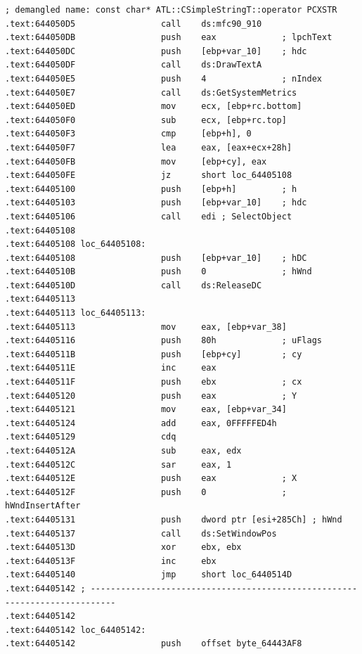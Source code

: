 \begin{lstlisting}
; demangled name: const char* ATL::CSimpleStringT::operator PCXSTR 
.text:644050D5                 call    ds:mfc90_910
.text:644050DB                 push    eax             ; lpchText
.text:644050DC                 push    [ebp+var_10]    ; hdc
.text:644050DF                 call    ds:DrawTextA
.text:644050E5                 push    4               ; nIndex
.text:644050E7                 call    ds:GetSystemMetrics
.text:644050ED                 mov     ecx, [ebp+rc.bottom]
.text:644050F0                 sub     ecx, [ebp+rc.top]
.text:644050F3                 cmp     [ebp+h], 0
.text:644050F7                 lea     eax, [eax+ecx+28h]
.text:644050FB                 mov     [ebp+cy], eax
.text:644050FE                 jz      short loc_64405108
.text:64405100                 push    [ebp+h]         ; h
.text:64405103                 push    [ebp+var_10]    ; hdc
.text:64405106                 call    edi ; SelectObject
.text:64405108
.text:64405108 loc_64405108:
.text:64405108                 push    [ebp+var_10]    ; hDC
.text:6440510B                 push    0               ; hWnd
.text:6440510D                 call    ds:ReleaseDC
.text:64405113
.text:64405113 loc_64405113:
.text:64405113                 mov     eax, [ebp+var_38]
.text:64405116                 push    80h             ; uFlags
.text:6440511B                 push    [ebp+cy]        ; cy
.text:6440511E                 inc     eax
.text:6440511F                 push    ebx             ; cx
.text:64405120                 push    eax             ; Y
.text:64405121                 mov     eax, [ebp+var_34]
.text:64405124                 add     eax, 0FFFFFED4h
.text:64405129                 cdq
.text:6440512A                 sub     eax, edx
.text:6440512C                 sar     eax, 1
.text:6440512E                 push    eax             ; X
.text:6440512F                 push    0               ; hWndInsertAfter
.text:64405131                 push    dword ptr [esi+285Ch] ; hWnd
.text:64405137                 call    ds:SetWindowPos
.text:6440513D                 xor     ebx, ebx
.text:6440513F                 inc     ebx
.text:64405140                 jmp     short loc_6440514D
.text:64405142 ; ---------------------------------------------------------------------------
.text:64405142
.text:64405142 loc_64405142:
.text:64405142                 push    offset byte_64443AF8


\end{lstlisting}
